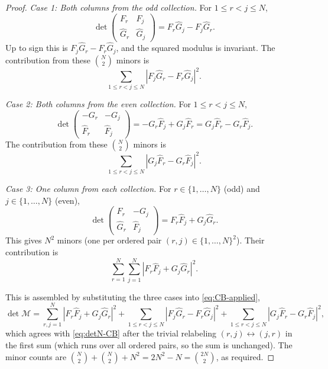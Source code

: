 \documentclass[10pt,a4paper]{amsart}
\begin{document}
\begin{proof}
\smallskip

\textit{Case 1: Both columns from the odd collection.} For $1 \le r < j \le N$,
\[
\det \begin{pmatrix} F_r & F_j  \\ \hat G_r & \hat G_j \end{pmatrix}
= F_r \hat G_j - F_j \hat G_r.
\]
Up to sign this is $F_j \hat G_r - F_r \hat G_j$, and the squared modulus is invariant. The contribution from these $\binom{N}{2}$ minors is
\[
\sum_{1 \le r < j \le N} |F_j \hat G_r - F_r \hat G_j|^2.
\]

\smallskip

\textit{Case 2: Both columns from the even collection.} For $1 \le r < j \le N$,
\[
\det \begin{pmatrix} -G_r & -G_j \\ \hat F_r  & \hat F_j \end{pmatrix}
= -G_r \hat F_j + G_j \hat F_r = G_j \hat F_r - G_r \hat F_j.
\]
The contribution from these $\binom{N}{2}$ minors is
\[
\sum_{1 \le r < j \le N} |G_j \hat F_r - G_r \hat F_j|^2.
\]

\smallskip

\textit{Case 3: One column from each collection.} For $r \in \{1,\ldots,N\}$ (odd) and $j \in \{1,\ldots,N\}$ (even),
\[
\det \begin{pmatrix} F_r & -G_j \\ \hat G_r & \hat F_j \end{pmatrix}
= F_r \hat F_j + G_j \hat G_r.
\]
This gives $N^2$ minors (one per ordered pair $(r,j) \in \{1,\ldots,N\}^2$). Their contribution is
\[
\sum_{r=1}^{N}\sum_{j=1}^{N} |F_r \hat F_j + G_j \hat G_r|^2.
\]

\bigskip

This is assembled by substituting the three cases into \eqref{eq:CB-applied},
\[
\det\mathcal{M}
= \sum_{r,j=1}^{N} |F_r \hat F_j + G_j \hat G_r|^2
+ \sum_{1\leq r<j\leq N} |F_j \hat G_r - F_r \hat G_j|^2
+ \sum_{1\leq r<j\leq N} |G_j \hat F_r - G_r \hat F_j|^2,
\]
which agrees with \eqref{eq:detN-CB} after the trivial relabeling $(r,j) \leftrightarrow (j,r)$ in the first sum (which runs over all ordered pairs, so the sum is unchanged).  The minor counts are $\binom{N}{2} + \binom{N}{2} + N^2 = 2N^2 - N = \binom{2N}{2}$, as required.
\end{proof}
\end{document}
